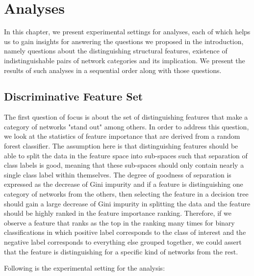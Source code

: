 \section*{Analyses}
In this chapter, we present experimental settings for analyses, each of which helps us to gain insights for answering the questions we proposed in the introduction, namely questions about the distinguishing structural features, existence of indistinguishable pairs of network categories and its implication. We present the results of such analyses in a sequential order along with those questions. 

\subsection*{Discriminative Feature Set}
The first question of focus is about the set of distinguishing features that make a category of networks "stand out" among others. In order to address this question, we look at the 
 statistics of feature importance that are derived from a random forest classifier. The assumption here is that distinguishing features should be able to split the data in the feature space into sub-spaces such that separation of class labels is good, meaning that these sub-spaces should only contain nearly a single class label within themselves. The degree of goodness of separation is expressed as the decrease of Gini impurity and if a feature is distinguishing one category of networks from the others, then selecting the feature in a decision tree should gain a large decrease of Gini impurity in splitting the data and the feature should be highly ranked in the feature importance ranking. Therefore, if we observe a feature that ranks as the top in the ranking many times for binary classifications in which positive label corresponds to the class of interest and the negative label corresponds to everything else grouped together, we could assert that the feature is distinguishing for a specific kind of networks from the rest. 
 
 Following is the experimental setting for the analysis: 

